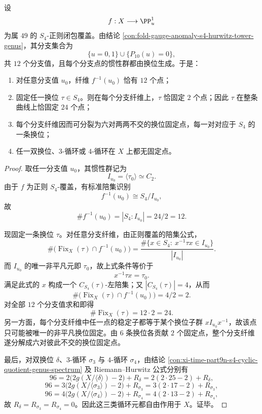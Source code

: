 \begin{conclusion}[分支纤维的六对换位固定点分解与其余三类循环元的自由作用]\label{con:xi-time-part9n-s4-branch-fiber-transposition-fixedpairs}
设
\[
f:X\longrightarrow \PP^1_u
\]
为属 \(49\) 的 \(S_4\)-正则闭包覆盖。由结论 \ref{con:fold-gauge-anomaly-s4-hurwitz-tower-genus}，其分支集合为
\[
\{u=0,1\}\cup\{P_{10}(u)=0\},
\]
共 \(12\) 个分支值，且每个分支点的惯性群都由换位生成。于是：
\begin{enumerate}
  \item 对任意分支值 \(u_0\)，纤维 \(f^{-1}(u_0)\) 恰有 \(12\) 个点；
  \item 固定任一换位 \(\tau\in S_4\)。则在每个分支纤维上，\(\tau\) 恰固定 \(2\) 个点；因此 \(\tau\) 在整条曲线上恰固定 \(24\) 个点；
  \item 每个分支纤维因而可分裂为六对两两不交的换位固定点，每一对对应于 \(S_4\) 的一条换位；
  \item 任一双换位、\(3\)-循环或 \(4\)-循环在 \(X\) 上都无固定点。
\end{enumerate}
\end{conclusion}
\begin{proof}
取任一分支值 \(u_0\)，其惯性群记为
\[
I_{u_0}=\langle \tau_0\rangle\simeq C_2.
\]
由于 \(f\) 为正则 \(S_4\)-覆盖，有标准陪集识别
\[
f^{-1}(u_0)\cong S_4/I_{u_0},
\]
故
\[
\#f^{-1}(u_0)=|S_4:I_{u_0}|=24/2=12.
\]

现固定一条换位 \(\tau\)。对任意分支纤维，由正则覆盖的陪集公式，
\[
\#\bigl(\operatorname{Fix}_X(\tau)\cap f^{-1}(u_0)\bigr)
=
\frac{\#\{x\in S_4:\ x^{-1}\tau x\in I_{u_0}\}}{|I_{u_0}|}.
\]
而 \(I_{u_0}\) 的唯一非平凡元即 \(\tau_0\)，故上式条件等价于
\[
x^{-1}\tau x=\tau_0.
\]
满足此式的 \(x\) 构成一个 \(C_{S_4}(\tau)\)-左陪集；又 \(|C_{S_4}(\tau)|=4\)，从而
\[
\#\bigl(\operatorname{Fix}_X(\tau)\cap f^{-1}(u_0)\bigr)=4/2=2.
\]
对全部 \(12\) 个分支值求和即得
\[
\#\operatorname{Fix}_X(\tau)=12\cdot 2=24.
\]
另一方面，每个分支纤维中任一点的稳定子都等于某个换位子群 \(xI_{u_0}x^{-1}\)，故该点只可能被唯一的非平凡换位固定。由 \(6\) 条换位各贡献 \(2\) 个固定点，整个分支纤维遂分解成六对彼此不交的换位固定点。

最后，对双换位 \(\delta\)、\(3\)-循环 \(\sigma_3\) 与 \(4\)-循环 \(\sigma_4\)，由结论 \ref{con:xi-time-part9n-s4-cyclic-quotient-genus-spectrum} 及 Riemann--Hurwitz 公式分别有
\[
96=2\bigl(2g(X/\langle\delta\rangle)-2\bigr)+R_\delta
=2(2\cdot 25-2)+R_\delta,
\]
\[
96=3\bigl(2g(X/\langle\sigma_3\rangle)-2\bigr)+R_{\sigma_3}
=3(2\cdot 17-2)+R_{\sigma_3},
\]
\[
96=4\bigl(2g(X/\langle\sigma_4\rangle)-2\bigr)+R_{\sigma_4}
=4(2\cdot 13-2)+R_{\sigma_4},
\]
故 \(R_\delta=R_{\sigma_3}=R_{\sigma_4}=0\)。因此这三类循环元都自由作用于 \(X\)。证毕。
\end{proof}

